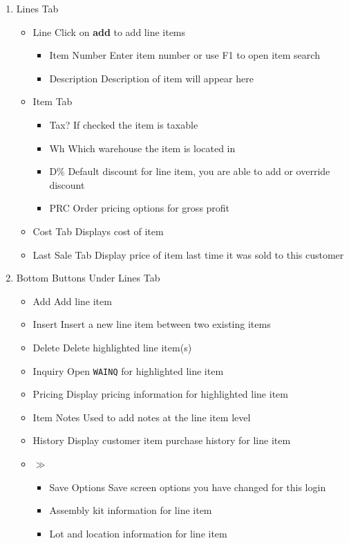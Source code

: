 \begin{enumerate}
	\item Lines Tab
	\begin{itemize}
		\item Line \textemdash Click on \textbf{add} to add line items
		\begin{itemize}		
			\item Item Number \textemdash Enter item number or use F1 to open item search
			\item Description \textemdash Description of item will appear here
		\end{itemize}
		\item Item Tab
		\begin{itemize}
			\item Tax? \textemdash If checked the item is taxable
			\item Wh \textemdash Which warehouse the item is located in
			\item D\% \textemdash Default discount for line item, you are able to add or override discount
			\item PRC \textemdash Order pricing options for gross profit
		\end{itemize}
		\item Cost Tab \textemdash Displays cost of item
		\item Last Sale Tab \textemdash Display price of item last time it was sold to this customer		
	\end{itemize}
	\item Bottom Buttons Under Lines Tab
	\begin{itemize}
		\item Add \textemdash Add line item
		\item Insert \textemdash Insert a new line item between two existing items
		\item Delete \textemdash Delete highlighted line item(s)
		\item Inquiry \textemdash Open \texttt{WAINQ} for highlighted line item
		\item Pricing \textemdash Display pricing information for highlighted line item
		\item Item Notes \textemdash Used to add notes at the line item level
		\item History \textemdash Display customer item purchase history for line item
		\item $\gg$
		\begin{itemize}
			\item Save Options \textemdash Save screen options you have changed for this login
			\item Assembly kit information for line item
			\item Lot and location information for line item
		\end{itemize}
	\end{itemize}
	

\end{enumerate}
